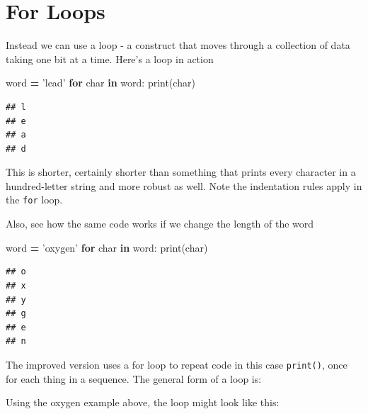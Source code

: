 \documentclass[]{book}
\newenvironment{Shaded}{\begin{snugshade}}{\end{snugshade}}
\newcommand{\BuiltInTok}[1]{#1}
\newcommand{\ControlFlowTok}[1]{\textcolor[rgb]{0.13,0.29,0.53}{\textbf{#1}}}
\newcommand{\KeywordTok}[1]{\textcolor[rgb]{0.13,0.29,0.53}{\textbf{#1}}}
\newcommand{\NormalTok}[1]{#1}
\newcommand{\OperatorTok}[1]{\textcolor[rgb]{0.81,0.36,0.00}{\textbf{#1}}}
\newcommand{\StringTok}[1]{\textcolor[rgb]{0.31,0.60,0.02}{#1}}
\theoremstyle{definition}
\theoremstyle{definition}
\theoremstyle{definition}
\theoremstyle{remark}
\begin{document}
\hypertarget{for-loops}{%
\section{For Loops}\label{for-loops}}

Instead we can use a loop - a construct that moves through a collection
of data taking one bit at a time. Here's a loop in action

\begin{Shaded}
\begin{Highlighting}[]
\NormalTok{word }\OperatorTok{=} \StringTok{'lead'}
\ControlFlowTok{for}\NormalTok{ char }\KeywordTok{in}\NormalTok{ word:}
    \BuiltInTok{print}\NormalTok{(char)}
\end{Highlighting}
\end{Shaded}

\begin{verbatim}
## l
## e
## a
## d
\end{verbatim}

This is shorter, certainly shorter than something that prints every
character in a hundred-letter string and more robust as well. Note the
indentation rules apply in the \texttt{for} loop.

Also, see how the same code works if we change the length of the word

\begin{Shaded}
\begin{Highlighting}[]
\NormalTok{word }\OperatorTok{=} \StringTok{'oxygen'}
\ControlFlowTok{for}\NormalTok{ char }\KeywordTok{in}\NormalTok{ word:}
    \BuiltInTok{print}\NormalTok{(char)}
\end{Highlighting}
\end{Shaded}

\begin{verbatim}
## o
## x
## y
## g
## e
## n
\end{verbatim}

The improved version uses a for loop to repeat code in this case
\texttt{print()}, once for each thing in a sequence. The general form of
a loop is:

Using the oxygen example above, the loop might look like this:
\end{document}
